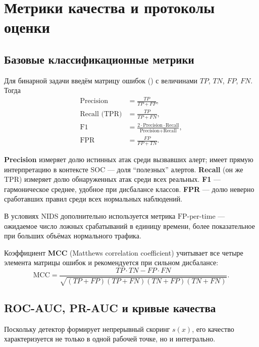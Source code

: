 \section{Метрики качества и протоколы оценки}
\label{sec:metrics}

\subsection{Базовые классификационные метрики}

Для бинарной задачи введём матрицу ошибок () с величинами
\(TP\), \(TN\), \(FP\), \(FN\). Тогда
\begin{align}
\text{Precision} &= \frac{TP}{TP + FP}, \label{eq:precision}\\
\text{Recall (TPR)} &= \frac{TP}{TP + FN}, \label{eq:recall}\\
\text{F1} &= \frac{2 \cdot \text{Precision} \cdot \text{Recall}}
                 {\text{Precision} + \text{Recall}},\label{eq:f1}\\
\text{FPR} &= \frac{FP}{FP + TN}.\label{eq:fpr}
\end{align}

\textbf{Precision} измеряет долю истинных атак среди вызвавших алерт; имеет
прямую интерпретацию в контексте SOC --- доля ``полезных'' алертов.
\textbf{Recall} (он же TPR) измеряет долю обнаруженных атак среди всех
реальных. \textbf{F1} --- гармоническое среднее, удобное при дисбалансе
классов. \textbf{FPR} --- долю неверно сработавших правил среди всех
нормальных наблюдений.

В условиях NIDS дополнительно используется метрика
\(\text{FP-per-time}\) --- ожидаемое число ложных срабатываний в единицу
времени, более показательное при больших объёмах нормального трафика.

Коэффициент \textbf{MCC} (Matthews correlation coefficient) учитывает все
четыре элемента матрицы ошибок и рекомендуется при сильном дисбалансе:
\begin{equation}
\text{MCC} =
\frac{TP \cdot TN - FP \cdot FN}
{\sqrt{(TP+FP)(TP+FN)(TN+FP)(TN+FN)}}.
\label{eq:mcc}
\end{equation}

\subsection{ROC-AUC, PR-AUC и кривые качества}

Поскольку детектор формирует непрерывный скоринг \(s(x)\), его качество
характеризуется не только в одной рабочей точке, но и интегрально.

